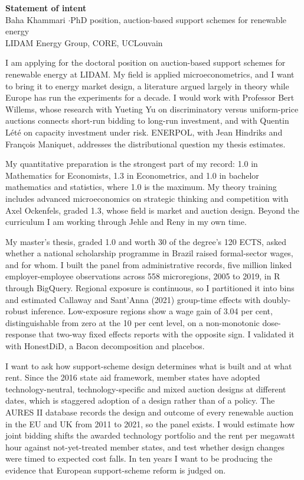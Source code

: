 \documentclass[a4paper,11pt]{article}
\begin{document}
\begin{center}
{\large\bfseries Statement of intent}\\[3pt]
{\small Baha Khammari \quad$\cdot$\quad PhD position, auction-based support schemes for renewable energy}\\
{\small LIDAM Energy Group, CORE, UCLouvain}
\end{center}

\vspace{2.5mm}

I am applying for the doctoral position on auction-based support schemes for renewable energy at LIDAM. My field is applied microeconometrics, and I want to bring it to energy market design, a literature argued largely in theory while Europe has run the experiments for a decade. I would work with Professor Bert Willems, whose research with Yueting Yu on discriminatory versus uniform-price auctions connects short-run bidding to long-run investment, and with Quentin L\'et\'e on capacity investment under risk. ENERPOL, with Jean Hindriks and Fran\c{c}ois Maniquet, addresses the distributional question my thesis estimates.

My quantitative preparation is the strongest part of my record: 1.0 in Mathematics for Economists, 1.3 in Econometrics, and 1.0 in bachelor mathematics and statistics, where 1.0 is the maximum. My theory training includes advanced microeconomics on strategic thinking and competition with Axel Ockenfels, graded 1.3, whose field is market and auction design. Beyond the curriculum I am working through Jehle and Reny in my own time.

My master's thesis, graded 1.0 and worth 30 of the degree's 120 ECTS, asked whether a national scholarship programme in Brazil raised formal-sector wages, and for whom. I built the panel from administrative records, five million linked employer-employee observations across 558 microregions, 2005 to 2019, in R through BigQuery. Regional exposure is continuous, so I partitioned it into bins and estimated Callaway and Sant'Anna (2021) group-time effects with doubly-robust inference. Low-exposure regions show a wage gain of 3.04 per cent, distinguishable from zero at the 10 per cent level, on a non-monotonic dose-response that two-way fixed effects reports with the opposite sign. I validated it with HonestDiD, a Bacon decomposition and placebos.

I want to ask how support-scheme design determines what is built and at what rent. Since the 2016 state aid framework, member states have adopted technology-neutral, technology-specific and mixed auction designs at different dates, which is staggered adoption of a design rather than of a policy. The AURES II database records the design and outcome of every renewable auction in the EU and UK from 2011 to 2021, so the panel exists. I would estimate how joint bidding shifts the awarded technology portfolio and the rent per megawatt hour against not-yet-treated member states, and test whether design changes were timed to expected cost falls. In ten years I want to be producing the evidence that European support-scheme reform is judged on.
\end{document}
